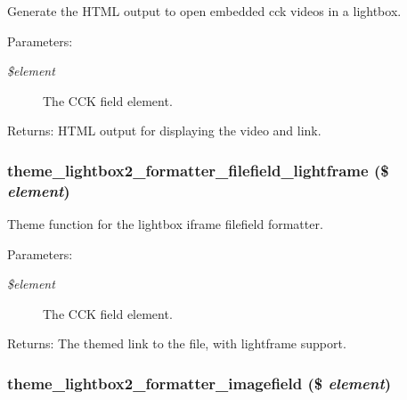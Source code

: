 Generate the HTML output to open embedded cck videos in a lightbox.

\begin{Desc}
\item[Parameters:]
\begin{description}
\item[{\em \$element}]The CCK field element. \end{description}
\end{Desc}
\begin{Desc}
\item[Returns:]HTML output for displaying the video and link. \end{Desc}
\hypertarget{lightbox2_8formatter_8inc_8721928b4c5064fea2bf2c1c150300bb}{
\subsubsection[{theme\_\-lightbox2\_\-formatter\_\-filefield\_\-lightframe}]{\setlength{\rightskip}{0pt plus 5cm}theme\_\-lightbox2\_\-formatter\_\-filefield\_\-lightframe (\$ {\em element})}}
\label{lightbox2_8formatter_8inc_8721928b4c5064fea2bf2c1c150300bb}


Theme function for the lightbox iframe filefield formatter.

\begin{Desc}
\item[Parameters:]
\begin{description}
\item[{\em \$element}]The CCK field element. \end{description}
\end{Desc}
\begin{Desc}
\item[Returns:]The themed link to the file, with lightframe support. \end{Desc}
\hypertarget{lightbox2_8formatter_8inc_450372bfe4bdee2f7542e81098166703}{
\subsubsection[{theme\_\-lightbox2\_\-formatter\_\-imagefield}]{\setlength{\rightskip}{0pt plus 5cm}theme\_\-lightbox2\_\-formatter\_\-imagefield (\$ {\em element})}}
\label{lightbox2_8formatter_8inc_450372bfe4bdee2f7542e81098166703}


